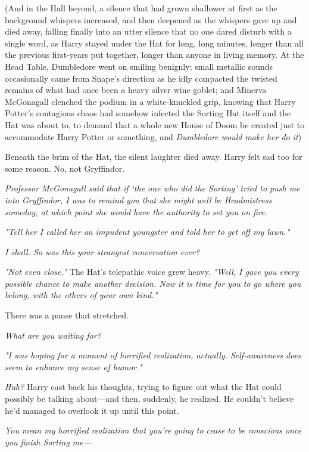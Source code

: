 (And in the Hall beyond, a silence that had grown shallower at first as the
background whispers increased, and then deepened as the whispers gave up and
died away, falling finally into an utter silence that no one dared disturb with
a single word, as Harry stayed under the Hat for long, long minutes, longer
than all the previous first-years put together, longer than anyone in living
memory. At the Head Table, Dumbledore went on smiling benignly; small metallic
sounds occasionally came from Snape's direction as he idly compacted the
twisted remains of what had once been a heavy silver wine goblet; and Minerva
McGonagall clenched the podium in a white-knuckled grip, knowing that Harry
Potter's contagious chaos had somehow infected the Sorting Hat itself and the
Hat was about to, to demand that a whole new House of Doom be created just to
accommodate Harry Potter or something, and \emph{Dumbledore would make her do
it}{\el})

Beneath the brim of the Hat, the silent laughter died away. Harry felt sad too
for some reason. No, not Gryffindor.

\emph{Professor McGonagall said that if `the one who did the Sorting' tried to
push me into Gryffindor, I was to remind you that she might well be
Headmistress someday, at which point she would have the authority to set you on
fire.}

\emph{"Tell her I called her an impudent youngster and told her to get off my
lawn."}

\emph{I shall. So was this your strangest conversation ever?}

\emph{"Not even close."} The Hat's telepathic voice grew heavy. \emph{"Well, I
gave you every possible chance to make another decision. Now it is time for you
to go where you belong, with the others of your own kind."}

There was a pause that stretched.

\emph{What are you waiting for?}

\emph{"I was hoping for a moment of horrified realization, actually.
Self-awareness does seem to enhance my sense of humor."}

\emph{Huh?} Harry cast back his thoughts, trying to figure out what the Hat
could possibly be talking about---and then, suddenly, he realized. He couldn't
believe he'd managed to overlook it up until this point.

\emph{You mean my horrified realization that you're going to cease to be
conscious once you finish Sorting me---}

